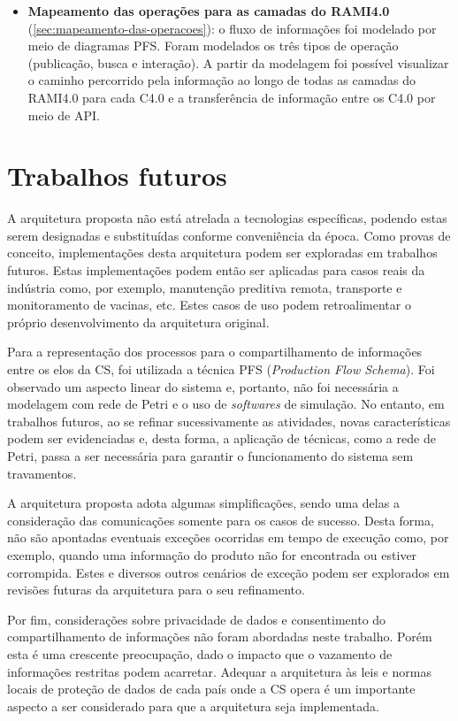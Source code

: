 \begin{itemize}
	\item \textbf{Mapeamento das operações para as camadas do RAMI4.0} (\autoref{sec:mapeamento-das-operacoes}): o fluxo de informações foi modelado por meio de diagramas PFS. Foram modelados os três tipos de operação (publicação, busca e interação). A partir da modelagem foi possível visualizar o caminho percorrido pela informação ao longo de todas as camadas do RAMI4.0 para cada C4.0 e a transferência de informação entre os C4.0 por meio de API.
\end{itemize}

\section{Trabalhos futuros}

A arquitetura proposta não está atrelada a tecnologias específicas, podendo estas serem designadas e substituídas conforme conveniência da época. Como provas de conceito, implementações desta arquitetura podem ser exploradas em trabalhos futuros. Estas implementações podem então ser aplicadas para casos reais da indústria como, por exemplo, manutenção preditiva remota, transporte e monitoramento de vacinas, etc. Estes casos de uso podem retroalimentar o próprio desenvolvimento da arquitetura original.

Para a representação dos processos para o compartilhamento de informações entre os elos da CS, foi utilizada a técnica PFS (\textit{Production Flow Schema}). Foi observado um aspecto linear do sistema e, portanto, não foi necessária a modelagem com rede de Petri e o uso de \textit{softwares} de simulação. No entanto, em trabalhos futuros, ao se refinar sucessivamente as atividades, novas características podem ser evidenciadas e, desta forma, a aplicação de técnicas, como a rede de Petri, passa a ser necessária para garantir o funcionamento do sistema sem travamentos.

A arquitetura proposta adota algumas simplificações, sendo uma delas a consideração das comunicações somente para os casos de sucesso. Desta forma, não são apontadas eventuais exceções ocorridas em tempo de execução como, por exemplo, quando uma informação do produto não for encontrada ou estiver corrompida. Estes e diversos outros cenários de exceção podem ser explorados em revisões futuras da arquitetura para o seu refinamento.

Por fim, considerações sobre privacidade de dados e consentimento do compartilhamento de informações não foram abordadas neste trabalho. Porém esta é uma crescente preocupação, dado o impacto que o vazamento de informações restritas podem acarretar. Adequar a arquitetura às leis e normas locais de proteção de dados de cada país onde a CS opera é um importante aspecto a ser considerado para que a arquitetura seja implementada.
